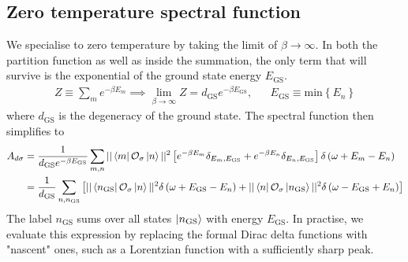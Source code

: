 \documentclass[reprint,hidelinks,onecolumn]{revtex4-2}
\begin{document}
\subsection{Zero temperature spectral function}
We specialise to zero temperature by taking the limit of \(\beta \to \infty\). In both the partition function as well as inside the summation, the only term that will survive is the exponential of the ground state energy \(E_\text{GS}\).
\begin{equation*}\begin{aligned}
	Z \equiv \sum_m e^{-\beta E_m} \implies \lim_{\beta \to \infty}Z = d_\text{GS} e^{-\beta E_\text{GS}}, && E_\text{GS} \equiv \text{min}\left\{ E_n \right\} 
\end{aligned}\end{equation*}
where \(d_\text{GS}\) is the degeneracy of the ground state. The spectral function then simplifies to
\begin{equation}\begin{aligned}
	\label{Gf_lk}
	A_{d\sigma} &= \frac{1}{d_\text{GS}e^{-\beta E_\text{GS}}}\sum_{m,n}||\bra{m}\mathcal{O}_{\sigma}\ket{n}||^2\left[e^{-\beta E_m}\delta_{E_m, E_\text{GS}} + e^{-\beta E_n}\delta_{E_n, E_\text{GS}}\right]\delta\left(\omega + E_m - E_n\right)\\
											 &= \frac{1}{d_\text{GS}}\sum_{n,n_\text{GS}}\left[||\bra{n_\text{GS}}\mathcal{O}_{\sigma}\ket{n}||^2\delta\left(\omega + E_\text{GS} - E_n\right) + ||\bra{n}\mathcal{O}_{\sigma}\ket{n_\text{GS}}||^2\delta\left(\omega - E_\text{GS} + E_n\right)\right]\\
\end{aligned}\end{equation}
The label \(n_\text{GS}\) sums over all states \(\ket{n_\text{GS}}\) with energy \(E_\text{GS}\). In practise, we evaluate this expression by replacing the formal Dirac delta functions with "nascent" ones, such as a Lorentzian function with a sufficiently sharp peak.
\end{document}
